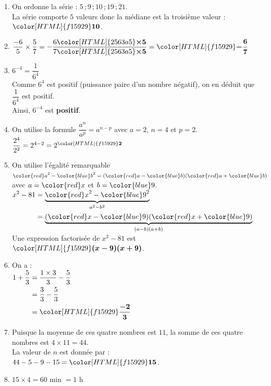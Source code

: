 \documentclass[a4paper,11pt,landscape,exos]{nsi} %
\begin{document}
\begin{multicols}{2}
\begin{enumerate}[]
\item On ordonne la série :  $5$\,;\,$9$\,;\,$10$\,;\,$19$\,;\,$21$.\\
      La série comporte $5$ valeurs donc la médiane est la troisième valeur : ${\color[HTML]{f15929}\boldsymbol{10}}$.
\item $\dfrac{-6}{5}\times \dfrac{5}{7}=-\dfrac{6{\color[HTML]{2563a5}\boldsymbol{\times5}} }{7{\color[HTML]{2563a5}\boldsymbol{\times5}}}={\color[HTML]{f15929}\boldsymbol{-\dfrac{6}{7}}}$
\item $6^{-4}=\dfrac{1}{6^{4}}$\\
     Comme  $6^{4}$ est  positif (puissance paire d'un nombre négatif), on en déduit que  $\dfrac{1}{6^{4}}$ est positif.\\
    Ainsi, $6^{-4}$ est {\bfseries \color[HTML]{f15929}positif}.
\item On utilise la formule $\dfrac{a^n}{a^p}=a^{n - p}$
        avec $a=2$,  $n=4$ et $p=2$.\\
        $\dfrac{2^{4}}{2^{2}}=2^{4-2}=2^{{\color[HTML]{f15929}\boldsymbol{2}}}$
\item On utilise l'égalité remarquable ${\color{red} a}^2-{\color{blue} b}^2=({\color{red} a}-{\color{blue} b})({\color{red} a}+{\color{blue} b})$ avec $a={\color{red} x}$  et $b={\color{blue} 9}$.\\$\begin{aligned}
 x^2-81&=\underbrace{{\color{red} x}^2-{\color{blue} 9}^2}_{a^2-b^2}\\
 &=\underbrace{({\color{red} x}-{\color{blue} 9})({\color{red} x}+{\color{blue} 9})}_{(a-b)(a+b)}
 \end{aligned}$ \\
    Une expression factorisée de $x^2-81$ est ${\color[HTML]{f15929}\boldsymbol{(x-9)(x+9)}}$.
\item On a : \\$\begin{aligned}
      1+\dfrac{5}{3} &= \dfrac{1 \times 3}{3} - \dfrac{5}{3} \\
      &= \dfrac{3}{3} - \dfrac{5}{3}\\
      &  ={\color[HTML]{f15929}\boldsymbol{\dfrac{-2}{3}}}
      \end{aligned}$
\item Puisque la moyenne de ces quatre nombres est $11$, la somme de ces quatre nombres est $4\times 11=44$.\\
             La valeur de $n$ est donnée par :  $44-5-9-15={\color[HTML]{f15929}\boldsymbol{15}}$.
\item $15\times 4= 60$ min $=1$ h\\

\end{enumerate}
\end{multicols}
\end{document}
